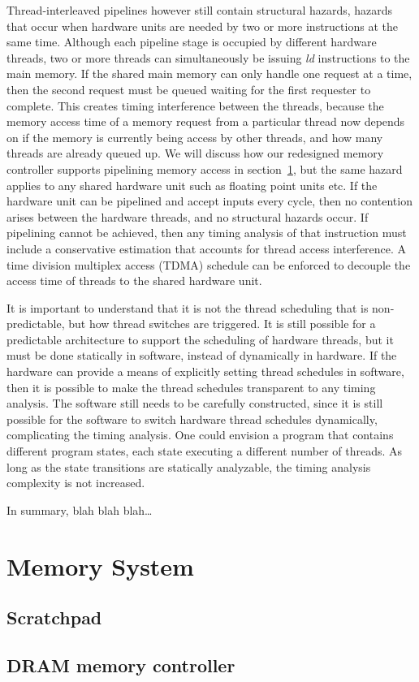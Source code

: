 Thread-interleaved pipelines however still contain structural hazards, hazards that occur when hardware units are needed by two or more instructions at the same time.
Although each pipeline stage is occupied by different hardware threads, two or more threads can simultaneously be issuing \emph{ld} instructions to the main memory.
If the shared main memory can only handle one request at a time, then the second request must be queued waiting for the first requester to complete.
This creates timing interference between the threads, because the memory access time of a memory request from a particular thread now depends on if the memory is currently being access by other threads, and how many threads are already queued up.
We will discuss how our redesigned memory controller supports pipelining memory access in section~\ref{section:memory_system}, but the same hazard applies to any shared hardware unit such as floating point units etc.
If the hardware unit can be pipelined and accept inputs every cycle, then no contention arises between the hardware threads, and no structural hazards occur.
If pipelining cannot be achieved, then any timing analysis of that instruction must include a conservative estimation that accounts for thread access interference.
A time division multiplex access (TDMA) schedule can be enforced to decouple the access time of threads to the shared hardware unit.
  
It is important to understand that it is not the thread scheduling that is non-predictable, but how thread switches are triggered.    
It is still possible for a predictable architecture to support the scheduling of hardware threads, but it must be done statically in software, instead of dynamically in hardware. 
If the hardware can provide a means of explicitly setting thread schedules in software, then it is possible to make the thread schedules transparent to any timing analysis.	 
The software still needs to be carefully constructed, since it is still possible for the software to switch hardware thread schedules dynamically, complicating the timing analysis. 
One could envision a program that contains different program states, each state executing a different number of threads. 
As long as the state transitions are statically analyzable, the timing analysis complexity is not increased. 

In summary, blah blah blah\ldots
\section{Memory System}
\label{section:memory_system}
\subsection{Scratchpad}
\subsection{DRAM memory controller}


